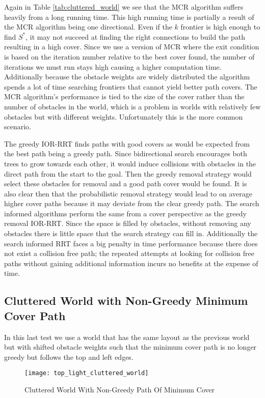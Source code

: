 Again in Table \ref{tab:cluttered_world} we see that the MCR algorithm suffers heavily from a long running time. This high running time is partially a result of the MCR algorithm being one directional. Even if the $k$ frontier is high enough to find $S^*$, it may not succeed at finding the right connections to build the path resulting in a high cover. Since we use a version of MCR where the exit condition is based on the iteration number relative to the best cover found, the number of iterations we must run stays high causing a higher computation time. Additionally because the obstacle weights are widely distributed the algorithm spends a lot of time searching frontiers that cannot yield better path covers. The MCR algorithm's performance is tied to the size of the cover rather than the number of obstacles in the world, which is a problem in worlds with relatively few obstacles but with different weights. Unfortunately this is the more common scenario.

The greedy IOR-RRT finds paths with good covers as would be expected from the best path being a greedy path. Since bidirectional search encourages both trees to grow towards each other, it would induce collisions with obstacles in the direct path from the start to the goal. Then the greedy removal strategy would select these obstacles for removal and a good path cover would be found. It is also clear then that the probabilistic removal strategy would lead to on average higher cover paths because it may deviate from the clear greedy path. The search informed algorithms perform the same from a cover perspective as the greedy removal IOR-RRT. Since the space is filled by obstacles, without removing any obstacles there is little space that the search strategy can fill in. Additionally the search informed RRT faces a big penalty in time performance because there does not exist a collision free path; the repeated attempts at looking for collision free paths without gaining additional information incurs no benefits at the expense of time.


\subsection{Cluttered World with Non-Greedy Minimum Cover Path}
In this last test we use a world that has the same layout as the previous world but with shifted obstacle weights such that the minimum cover path is no longer greedy but follows the top and left edges. 

\begin{figure}[h!]
    \centering
    \texttt{[image: top\_light\_cluttered\_world]}
    \caption{Cluttered World With Non-Greedy Path Of Minimum Cover}
    \label{fig:top_light_cluttered_world}
\end{figure}

